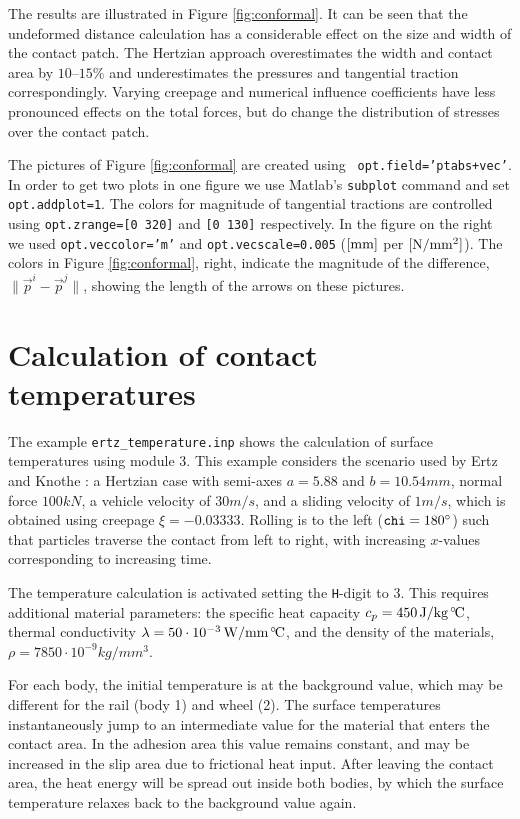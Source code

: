 \documentclass[12pt]{report}
\begin{document}
The results are illustrated in Figure \ref{fig:conformal}. It can be seen
that the undeformed distance calculation has a considerable effect on the size
and width of the contact patch. The Hertzian approach overestimates the
width and contact area by $10\text{--}15\%$ and underestimates the pressures
and tangential traction correspondingly. Varying creepage and numerical
influence coefficients have less pronounced effects on the total forces,
but do change the distribution of stresses over the contact patch. 

The pictures of Figure \ref{fig:conformal} are created using {\tt
opt.field='ptabs+vec'}. In order to get two plots in one figure we use
Matlab's {\tt subplot} command and set {\tt opt.addplot=1}. The colors for
magnitude of tangential tractions are controlled using {\tt opt.zrange=[0
320]} and {\tt [0 130]} respectively. In the figure on the right we used
{\tt opt.veccolor='m'} and {\tt opt.vecscale=0.005} ($[\mathrm{mm}]$ per
$[\mathrm{N/mm^2}]$). The colors in Figure \ref{fig:conformal}, right, indicate the
magnitude of the difference, $\|\vec{p}^i-\vec{p}^j\|$, showing the length
of the arrows on these pictures.

\section{Calculation of contact temperatures}
\label{sec:ex_temperature}

The example {\tt ertz\_temperature.inp} shows the calculation of surface
temperatures using module 3. This example considers the scenario
used by Ertz and Knothe \cite{Ertz2002a}: a Hertzian case with semi-axes
$a=5.88$ and $b=10.54\unit{mm}$, normal force $100\unit{kN}$, a vehicle velocity of
$30\unit{m/s}$, and a sliding velocity of $1\unit{m/s}$, which is obtained using
creepage $\xi=-0.03333$. Rolling is to the left (${\tt chi}=180^\circ$)
such that particles traverse the contact from left to right, with
increasing $x$-values corresponding to increasing time.

The temperature calculation is activated setting the {\tt H}-digit to 3.
This requires additional material parameters: the specific heat capacity
$c_p=450\,\mathrm{J/kg\mbox{}^{\,\circ\!}\mathrm{C}}$, thermal conductivity $\lambda=50\cdot
10^{-3}\,\mathrm{W/mm\mbox{}^{\,\circ\!}\mathrm{C}}$, and the density of the materials, $\rho=7850\cdot 
10^{-9}\unit{kg/mm^3}$.

For each body, the initial temperature is at the background value, which
may be different for the rail (body 1) and wheel (2). The surface
temperatures instantaneously jump to an intermediate value for the material
that enters the contact area. In the adhesion area this value remains
constant, and may be increased in the slip area due to frictional heat
input. After leaving the contact area, the heat energy will be spread out
inside both bodies, by which the surface temperature relaxes back to the
background value again.
\end{document}
